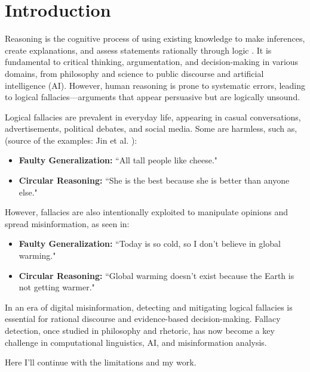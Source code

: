 \chapter{Introduction}

Reasoning is the cognitive process of using existing knowledge to make inferences, create explanations, and assess statements rationally through logic \cite{InternetClassicsArchive}. It is fundamental to critical thinking, argumentation, and decision-making in various domains, from philosophy and science to public discourse and artificial intelligence (AI). However, human reasoning is prone to systematic errors, leading to logical fallacies—arguments that appear persuasive but are logically unsound.

Logical fallacies are prevalent in everyday life, appearing in casual conversations, advertisements, political debates, and social media. Some are harmless, such as, (source of the examples: Jin et al. \cite{jinLogicalFallacyDetection2022}):

\begin{itemize}
    \item \textbf{Faulty Generalization:} ``All tall people like cheese."
    \item \textbf{Circular Reasoning:} ``She is the best because she is better than anyone else."
\end{itemize}

However, fallacies are also intentionally exploited to manipulate opinions and spread misinformation, as seen in:

\begin{itemize}
    \item \textbf{Faulty Generalization:} ``Today is so cold, so I don’t believe in global warming."
    \item \textbf{Circular Reasoning:} ``Global warming doesn’t exist because the Earth is not getting warmer."
\end{itemize}

In an era of digital misinformation, detecting and mitigating logical fallacies is essential for rational discourse and evidence-based decision-making. Fallacy detection, once studied in philosophy and rhetoric, has now become a key challenge in computational linguistics, AI, and misinformation analysis.

Here I'll continue with the limitations and my work.




\noindent 
